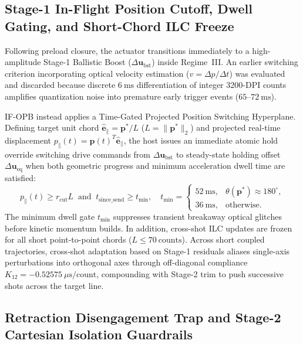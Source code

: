 \documentclass[journal]{IEEEtran}
\begin{document}
\subsection{Stage-1 In-Flight Position Cutoff, Dwell Gating, and Short-Chord ILC Freeze}

Following preload closure, the actuator transitions immediately to a high-amplitude Stage-1 Ballistic Boost ($\Delta\mathbf{u}_{\text{bst}}$) inside Regime~III. An earlier switching criterion incorporating optical velocity estimation ($v = \Delta p / \Delta t$) was evaluated and discarded because discrete $6\ \text{ms}$ differentiation of integer 3200-DPI counts amplifies quantization noise into premature early trigger events ($65\text{--}72\ \text{ms}$).

IF-OPB instead applies a Time-Gated Projected Position Switching Hyperplane. Defining target unit chord $\hat{\mathbf{e}}_\parallel = \mathbf{p}^* / L$ ($L = \|\mathbf{p}^*\|_2$) and projected real-time displacement $p_\parallel(t) = \mathbf{p}(t)^T \hat{\mathbf{e}}_\parallel$, the host issues an immediate atomic hold override switching drive commands from $\Delta\mathbf{u}_{\text{bst}}$ to steady-state holding offset $\Delta\mathbf{u}_{\text{eq}}$ when both geometric progress and minimum acceleration dwell time are satisfied:
\begin{equation}
p_\parallel(t) \ge r_{\text{cut}} L \;\; \text{and} \;\; t_{\text{since\_send}} \ge t_{\min}, \quad t_{\min} = \begin{cases} 52\ \text{ms}, & \theta(\mathbf{p}^*) \approx 180^\circ, \\ 36\ \text{ms}, & \text{otherwise.} \end{cases}
\end{equation}
The minimum dwell gate $t_{\min}$ suppresses transient breakaway optical glitches before kinetic momentum builds. In addition, cross-shot ILC updates are frozen for all short point-to-point chords ($L \le 70\ \text{counts}$). Across short coupled trajectories, cross-shot adaptation based on Stage-1 residuals aliases single-axis perturbations into orthogonal axes through off-diagonal compliance $K_{12} = -0.52575\ \mu\text{s}/\text{count}$, compounding with Stage-2 trim to push successive shots across the target line.

\subsection{Retraction Disengagement Trap and Stage-2 Cartesian Isolation Guardrails}
\end{document}
